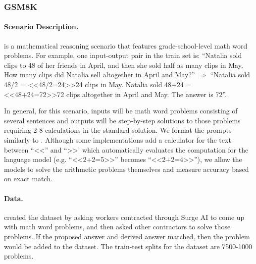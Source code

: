 \subsubsection{GSM8K}
\label{app:gsm}

\paragraph{Scenario Description.}
\gsm \citep{cobbe2021training} is a mathematical reasoning scenario that features grade-school-level math word problems.
For example, one input-output pair in the train set is: 
``Natalia sold clips to 48 of her friends in April, and then she sold half as many clips in May. How many clips did Natalia sell altogether in April and May?'' $\Rightarrow$ ``Natalia sold 48/2 = <<48/2=24>>24 clips in May. Natalia sold 48+24 = <<48+24=72>>72 clips altogether in April and May. The answer is 72''. 

In general, for this scenario, inputs will be math word problems consisting of several sentences and outputs will be step-by-step solutions to those problems requiring 2-8 calculations in the standard solution. We format the prompts similarly to \citet{wei2022chain}. Although some implementations add a calculator for the text between ``<<'' and ``>>' which automatically evaluates the computation for the language model (e.g. ``<<2+2=5>>'' becomes ``<<2+2=4>>''), we allow the models to solve the arithmetic problems themselves and measure accuracy based on exact match.
\paragraph{Data.}
\citet{cobbe2021training} created the dataset by asking workers contracted through Surge AI to come up with math word problems, and then asked other contractors to solve those problems. If the proposed answer and derived answer matched, then the problem would be added to the dataset. 
The train-test splits for the dataset are 7500-1000 problems.

